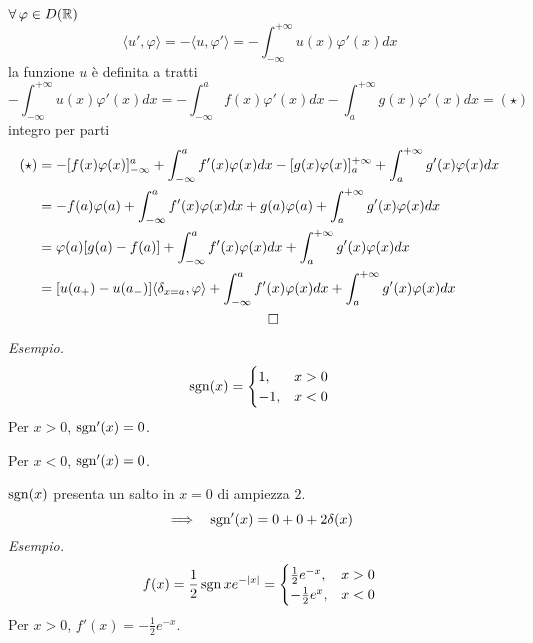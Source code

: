 $\forall \varphi \in D(\RR)$
\begin{equation*}
\langle u', \varphi \rangle = - \langle u, \varphi '\rangle = - \int^{+ \infty}_{- \infty} u(x) \varphi '(x) dx
\end{equation*}
la funzione $u$ è definita a tratti
\begin{equation*}
- \int^{+ \infty}_{- \infty} u(x) \varphi '(x) dx = -\int^{a}_{- \infty} f(x) \varphi '(x) dx - \int^{+ \infty}_{a} g(x) \varphi '(x) dx = (\star)
\end{equation*}
integro per parti
\begin{gather*}
\begin{aligned}
(\star) & = - [ f(x) \varphi (x)]^{a}_{- \infty} + \int^{a}_{- \infty} f'(x) \varphi (x) dx - [ g(x) \varphi (x)]^{+ \infty}_{a} + \int^{+ \infty}_{a} g'(x) \varphi (x) dx\\
 & = - f(a) \varphi (a) + \int^{a}_{- \infty} f'(x) \varphi (x) dx + g(a) \varphi (a) + \int^{+ \infty}_{a} g'(x) \varphi (x) dx\\
 & = \varphi (a)[ g(a) - f(a)] + \int^{a}_{- \infty} f'(x) \varphi (x) dx + \int^{+ \infty}_{a} g'(x) \varphi (x) dx\\
 & = [ u(a_{+}) - u(a_{-})] \langle \delta_{x = a}, \varphi \rangle + \int^{a}_{- \infty} f'(x) \varphi (x) dx + \int^{+ \infty}_{a} g'(x) \varphi (x) dx
\end{aligned}\\
\qed 
\end{gather*}
\textit{Esempio.}
\begin{equation*}
\operatorname{sgn}(x) = 
\begin{cases}
1, & x > 0\\
- 1, & x < 0
\end{cases}
\end{equation*}
Per $x > 0$, $\operatorname{sgn} '(x) = 0$.

Per $x < 0$, $\operatorname{sgn} '(x) = 0$.

$\operatorname{sgn}(x)$ presenta un salto in $x = 0$ di ampiezza $2$.
\begin{equation*}
\implies \ \ \operatorname{sgn} '(x) = 0 + 0 + 2\delta (x)
\end{equation*}
\textit{Esempio.}
\begin{equation*}
f(x) = \frac{1}{2}\operatorname{sgn} xe^{- | x|} = 
\begin{cases}
\frac{1}{2} e^{- x}, & x > 0\\
- \frac{1}{2} e^{x}, & x < 0
\end{cases}
\end{equation*}
Per $x > 0$, $f'(x) = - \frac{1}{2} e^{- x}$.

